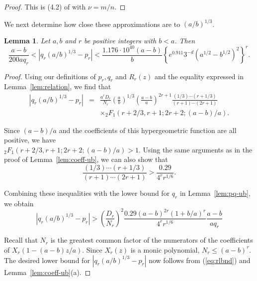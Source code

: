 \documentclass{jT}
\newtheorem{lemma}[theorem]{Lemma}
\theoremstyle{definition}
\begin{document}
\begin{proof}
This is (4.2) of \cite{Chud} with $\nu=m/n$.
\end{proof}

We next determine how close these approximations are to $(a/b)^{1/3}$. 

\begin{lemma}
\label{lem:8}
Let $a,b$ and $r$ be positive integers with $b < a$. Then 
\begin{equation}
\label{eq:remest}
\frac{a-b}{200aq_{r}} < \left| q_{r} (a/b)^{1/3} - p_{r} \right| 
< \frac{1.176 \cdot 10^{40} (a-b)}{b} 
  { \left\{ e^{0.911} 3^{-d} { \left( a^{1/2}-b^{1/2} \right) }^{2} 
    \right\} }^{r}. 
\end{equation}  
\end{lemma}

\begin{proof}
Using our definitions of $p_{r}, q_{r}$ and 
$R_{r}(z)$ and the equality expressed in Lemma~\ref{lem:relation}, 
we find that 
\begin{eqnarray*}
\left| q_{r} (a/b)^{1/3} - p_{r} \right| 
& = & \frac{a^{r} D_{r}}{N_{r}} { \left( \frac{a}{b} \right) }^{1/3} 
      { \left( \frac{a-b}{a} \right) }^{2r+1} 
      \frac{(1/3) \cdots (r+1/3)}{(r+1) \cdots (2r+1)} \\
&   & \times {}_{2} F_{1} \left( r+2/3, r+1; 2r+2; (a-b)/a \right). 
\end{eqnarray*}

Since $(a-b)/a$ and the coefficients of this hypergeometric  
function are all positive, we have \\
${}_{2} F_{1} \left( r+2/3, r+1; 2r+2; (a-b)/a \right) > 1$. 
Using the same arguments as in the proof of Lemma~\ref{lem:coeff-ub}, 
we can also show that 
\begin{displaymath}
\frac{(1/3) \cdots (r+1/3)}{(r+1) \cdots (2r+1)} 
> \frac{0.29}{4^{r}r^{1/6}}. 
\end{displaymath}

Combining these inequalities with the lower bound 
for $q_{r}$ in Lemma~\ref{lem:pq-ub}, we obtain 
\begin{equation}
\label{eq:rlbnd}
\left| q_{r} (a/b)^{1/3} - p_{r} \right| 
> { \left( \frac{D_{r}}{N_{r}} \right) }^{2} 
  \frac{0.29(a-b)^{2r}(1+b/a)^{r}}{4^{r}r^{1/6}} 
  \frac{a-b}{aq_{r}}
\end{equation}

Recall that $N_{r}$ is the greatest common factor 
of the numerators of the coefficients of 
$X_{r} \left( 1 - (a-b)z/a \right)$. Since 
$X_{r}(z)$ is a monic polynomial, 
$N_{r} \leq (a-b)^{r}$. The desired lower bound for 
$\left| q_{r} (a/b)^{1/3} - p_{r} \right|$  
now follows from (\ref{eq:rlbnd}) and Lemma~\ref{lem:coeff-ub}(a). 


\end{proof}
\end{document}
